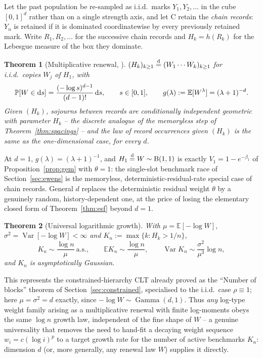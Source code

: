 \documentclass[11pt]{article}
\newcommand{\PP}{\mathbb{P}}
\newcommand{\EE}{\mathbb{E}}
\theoremstyle{plain}
\newtheorem{theorem}{Theorem}[section]
\theoremstyle{definition}
\begin{document}
Let the past population be re-sampled as i.i.d.\ marks \(Y_1,Y_2,\dots\) in
the cube \([0,1]^d\) rather than on a single strength axis, and let {\rm C}
retain the \emph{chain records}: \(Y_n\) is retained if it is dominated
coordinatewise by every previously retained mark. Write \(R_1,R_2,\dots\) for
the successive chain records and \(H_k=h(R_k)\) for the Lebesgue measure of
the box they dominate.

\begin{theorem}[Multiplicative renewal, {\cite{GnedinChainRecords2007}}]
\label{thm:chain-renewal}
\((H_k)_{k\ge1}\stackrel{\rm d}{=}(W_1\cdots W_k)_{k\ge1}\) for i.i.d.\ copies
\(W_j\) of \(H_1\), with
\[
\PP[W\in{\rm d}s]=\frac{(-\log s)^{d-1}}{(d-1)!}\,{\rm d}s,\qquad s\in[0,1],
\qquad g(\lambda):=\EE[W^\lambda]=(\lambda+1)^{-d}.
\]
Given \((H_k)\), sojourns between records are conditionally independent
geometric with parameter \(H_k\) -- the discrete analogue of the memoryless
step of Theorem~\ref{thm:spacings} -- and the law of record occurrences given
\((H_k)\) is the \emph{same as the one-dimensional case, for every \(d\)}.
\end{theorem}

At \(d=1\), \(g(\lambda)=(\lambda+1)^{-1}\), and \(H_1\stackrel{\rm d}=W\sim
{\rm B}(1,1)\) is exactly \(V_1=1-e^{-\beta_1}\) of Proposition~\ref{prop:gem}
with \(\theta=1\): the single-slot benchmark race of Section~\ref{sec:ewens}
is the memoryless, deterministic-residual-rate special case of chain records.
General \(d\) replaces the deterministic residual weight \(\theta\) by a
genuinely random, history-dependent one, at the price of losing the
elementary closed form of Theorem~\ref{thm:esf} beyond \(d=1\).

\begin{theorem}[Universal logarithmic growth]
\label{thm:log-growth}
With \(\mu=\EE[-\log W]\), \(\sigma^2=\operatorname{Var}[-\log W]<\infty\) and
\(K_n:=\max\{k:H_k>1/n\}\),
\[
K_n\sim\frac{\log n}\mu\ \text{a.s.},\qquad \EE K_n\sim\frac{\log n}\mu,\qquad
\operatorname{Var}K_n\sim\frac{\sigma^2}{\mu^3}\log n,
\]
and \(K_n\) is asymptotically Gaussian.
\end{theorem}

This represents the constrained-hierarchy CLT already proved as the
``Number of blocks'' theorem of Section~\ref{sec:constrained}, specialised to
the i.i.d.\ case \(\rho\equiv1\); here \(\mu=\sigma^2=d\) exactly, since
\(-\log W\sim\operatorname{Gamma}(d,1)\). Thus \emph{any} log-type weight
family arising as a multiplicative renewal with finite log-moments obeys the
same \(\log n\) growth law, independent of the fine shape of \(W\) -- a
genuine universality that removes the need to hand-fit a decaying weight
sequence \(w_i=c(\log i)^p\) to a target growth rate for the number of active
benchmarks \(K_n\): dimension \(d\) (or, more generally, any renewal law
\(W\)) supplies it directly.
\end{document}
